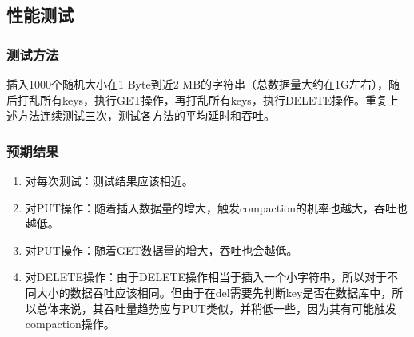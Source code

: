 \documentclass{ctexart}
\begin{document}
\subsection{性能测试}

\subsubsection{测试方法}
插入1000个随机大小在1 Byte到近2 MB的字符串（总数据量大约在1G左右），随后打乱所有keys，执行GET操作，再打乱所有keys，执行DELETE操作。重复上述方法连续测试三次，测试各方法的平均延时和吞吐。
\subsubsection{预期结果}
\begin{enumerate}
  \item 对每次测试：测试结果应该相近。
  \item 对PUT操作：随着插入数据量的增大，触发compaction的机率也越大，吞吐也越低。
  \item 对PUT操作：随着GET数据量的增大，吞吐也会越低。
  \item 对DELETE操作：由于DELETE操作相当于插入一个小字符串，所以对于不同大小的数据吞吐应该相同。但由于在del需要先判断key是否在数据库中，所以总体来说，其吞吐量趋势应与PUT类似，并稍低一些，因为其有可能触发compaction操作。
\end{enumerate}
\end{document}

